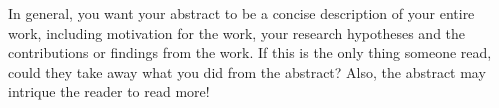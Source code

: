 
In general, you want your abstract to be a concise description of your entire work, including motivation for the work, your research hypotheses and the contributions or findings from the work. If this is the only thing someone read, could they take away what you did from the abstract?  Also, the abstract may intrique the reader to read more!
